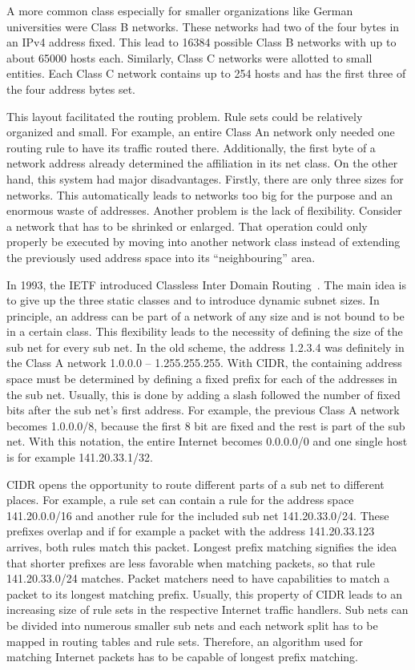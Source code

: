 \documentclass[a4paper,
		12pt,
		parskip=full,
		titlepage
		]{scrartcl}
\begin{document}
A more common class especially for smaller organizations like German universities were Class B networks.
These networks had two of the four bytes in an IPv4 address fixed.
This lead to 16384 possible Class B networks with up to about 65000 hosts each.
Similarly, Class C networks were allotted to small entities.
Each Class C network contains up to 254 hosts and has the first three of the four address bytes set.

This layout facilitated the routing problem.
Rule sets could be relatively organized and small.
For example, an entire Class An network only needed one routing rule to have its traffic routed there.
Additionally, the first byte of a network address already determined the affiliation in its net class.
On the other hand, this system had major disadvantages.
Firstly, there are only three sizes for networks.
This automatically leads to networks too big for the purpose and an enormous waste of addresses.
Another problem is the lack of flexibility.
Consider a network that has to be shrinked or enlarged.
That operation could only properly be executed by moving into another network class instead of extending the 
previously used address space into its \enquote{neighbouring} area.

In 1993, the IETF introduced Classless Inter Domain Routing~\cite{rfc1518, rfc4632}.
The main idea is to give up the three static classes and to introduce dynamic subnet sizes.
In principle, an address can be part of a network of any size and is not bound to be in a certain class.
This flexibility leads to the necessity of defining the size of the sub net for every sub net.
In the old scheme, the address 1.2.3.4 was definitely in the Class A network 1.0.0.0 -- 1.255.255.255.
With CIDR, the containing address space must be determined by defining a fixed prefix for each of the addresses in the sub net.
Usually, this is done by adding a slash followed the number of fixed bits after the sub net's first address.
For example, the previous Class A network becomes 1.0.0.0/8, because the first 8 bit are fixed and the rest is part of the sub net.
With this notation, the entire Internet becomes 0.0.0.0/0 and one single host is for example 141.20.33.1/32.

CIDR opens the opportunity to route different parts of a sub net to different places.
For example, a rule set can contain a rule for the address space 141.20.0.0/16 and another rule for the included sub net 141.20.33.0/24.
These prefixes overlap and if for example a packet with the address 141.20.33.123 arrives, both rules match this packet.
Longest prefix matching signifies the idea that shorter prefixes are less favorable when matching packets, so that rule 141.20.33.0/24 matches.
Packet matchers need to have capabilities to match a packet to its longest matching prefix.
Usually, this property of CIDR leads to an increasing size of rule sets in the respective Internet traffic handlers. %
Sub nets can be divided into numerous smaller sub nets and each network split has to be mapped in routing tables and rule sets.
Therefore, an algorithm used for matching Internet packets has to be capable of longest prefix matching.
\end{document}
